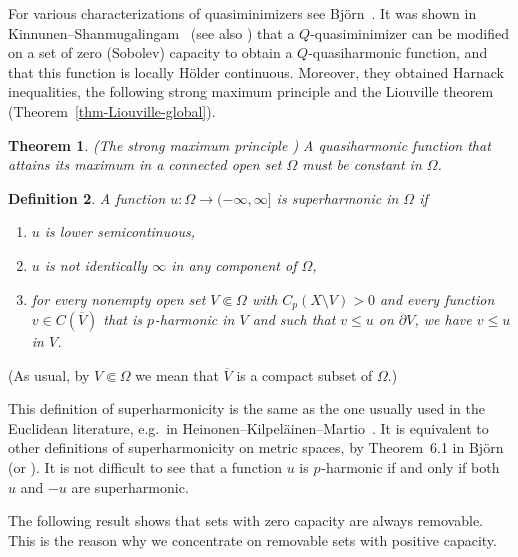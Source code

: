 \documentclass[a4paper,twoside]{article}
\theoremstyle{propositional}
\newtheorem{thm}{Theorem}[section]
\theoremstyle{descriptive}
\newtheorem{deff}[thm]{Definition}
\theoremstyle{remarkstyle}
\newcommand{\setm}{\setminus}
\newcommand{\Cp}{{C_p}}
\newcommand{\bdry}{\partial}
\newcommand{\bdy}{\bdry}
\newcommand{\Om}{\Omega}
\newcommand{\p}{{$p\mspace{1mu}$}}
\newcommand{\clV}{\overline{V}}
\numberwithin{equation}{section}
\begin{document}
For various characterizations of quasiminimizers
see Bj\"orn~\cite{ABkellogg}.
It was shown in Kinnunen--Shan\-mu\-ga\-lin\-gam~\cite{KiSh01} 
(see also \cite[Section~10]{BBsemilocal}) that 
a $Q$-quasiminimizer 
can be modified on a set of zero (Sobolev) capacity to obtain
a $Q$-quasiharmonic function,
and that this function is locally H\"older continuous.
Moreover, they obtained Harnack inequalities,
the following strong maximum principle and the Liouville theorem
(Theorem~\ref{thm-Liouville-global}).

\begin{thm} \label{thm-max}
\textup{(The strong maximum principle \cite[Corollary~6.4]{KiSh01})}
  A quasiharmonic function that attains
  its maximum in a connected open set $\Om$ must be constant in $\Om$.
\end{thm}


\begin{deff} \label{deff-superharm-class}
A function $u : \Om \to (-\infty,\infty]$ is 
\emph{superharmonic} in $\Om$ if
\begin{enumerate}
\renewcommand{\theenumi}{\textup{(\roman{enumi})}}%
\item \label{cond-a} $u$ is lower semicontinuous,
\item \label{cond-b} 
 $u$ is not identically $\infty$ in any component of $\Om$,
\item \label{cond-c}
for every nonempty open set $V \Subset \Om$ with $\Cp(X \setm V)>0$
and every function $v\in C(\clV)$ that
is \p-harmonic in $V$ and such
that $v\le u$ on $\bdy V$, we have $v\le u$ in $V$.
\end{enumerate}
\end{deff}

(As usual, by $V \Subset \Om$ we mean that $\clV$
is a compact subset of $\Om$.)



This definition of superharmonicity is the same as the one
usually used in the Euclidean literature, e.g.\ in
Hei\-no\-nen--Kil\-pe\-l\"ai\-nen--Martio~\cite[Section~7]{HeKiMa}.
It is equivalent to other definitions of superharmonicity on metric spaces,
by Theorem~6.1 in Bj\"orn~\cite{ABsuper}
(or \cite[Theorem~14.10]{BBbook}).
It is not difficult to see that a function $u$ is \p-harmonic if and only if 
both $u$ and $-u$ are superharmonic.



The following result shows
that sets with zero capacity are always removable. 
This is the reason why 
we concentrate 
on removable sets with positive capacity.
\end{document}
